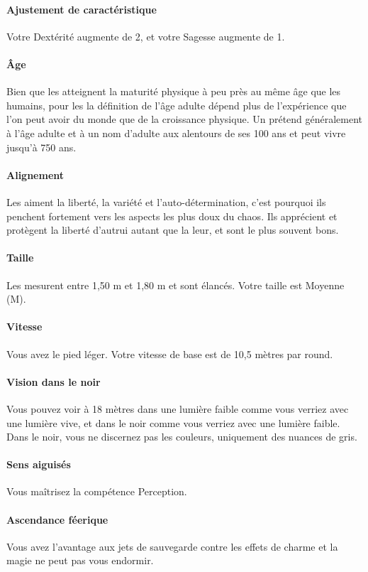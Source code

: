 \documentclass[a4paper,10pt,openany]{book}
\begin{document}
\begin{multicols}{2}
\paragraph{Ajustement de caractéristique}
Votre Dextérité augmente de 2, et votre Sagesse augmente de 1.
\paragraph{\^Age}
Bien que les \Elfes atteignent la maturité physique à peu près au même âge que les humains, pour les \Elfes la définition de l’âge adulte dépend plus
de l’expérience que l’on peut avoir du monde que de la croissance physique. Un \Elfe prétend généralement à l’âge adulte et à un nom d’adulte aux
alentours de ses 100 ans et peut vivre jusqu’à 750 ans.
\paragraph{Alignement}
Les \Elfes aiment la liberté, la variété et l’auto-détermination, c’est pourquoi ils penchent fortement vers les aspects les plus doux du chaos. Ils
apprécient et protègent la liberté d’autrui autant que la leur, et sont le plus souvent bons.
\paragraph{Taille}
Les \Elfes mesurent entre 1,50 m et 1,80 m et sont élancés. Votre taille est Moyenne (M).
\paragraph{Vitesse}
Vous avez le pied léger. Votre vitesse de base est de 10,5 mètres par round.
\paragraph{Vision dans le noir}
Vous pouvez voir à 18 mètres dans une lumière faible comme vous verriez avec une lumière vive, et dans le noir comme vous verriez avec une lumière
faible. Dans le noir, vous ne discernez pas les couleurs, uniquement des nuances de gris.
\paragraph{Sens aiguisés}
Vous maîtrisez la compétence Perception.
\paragraph{Ascendance féerique}
Vous avez l’avantage aux jets de sauvegarde contre les effets de charme et la magie ne peut pas vous endormir.

\end{multicols}
\end{document}
